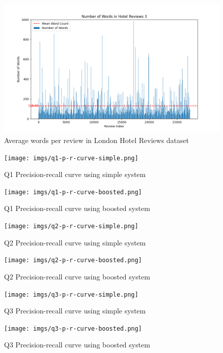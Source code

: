 \documentclass[sigconf]{acmart}
\begin{document}
\begin{figure}[H]
  \centering
  \includegraphics[width=\linewidth]{imgs/word_count_3.png}
  \caption{Average words per review in London Hotel Reviews dataset}
  \label{fig:reviewWords3}
\end{figure}


\begin{figure}[H]
  \centering
  \texttt{[image: imgs/q1-p-r-curve-simple.png]}
  \caption{Q1 Precision-recall curve using simple system}
  \label{fig:q1_simple}
\end{figure}

\begin{figure}[H]
  \centering
  \texttt{[image: imgs/q1-p-r-curve-boosted.png]}
  \caption{Q1 Precision-recall curve using boosted system}
  \label{fig:q1_boosted}
\end{figure}


\begin{figure}[H]
  \centering
  \texttt{[image: imgs/q2-p-r-curve-simple.png]}
  \caption{Q2 Precision-recall curve using simple system}
  \label{fig:q2_simple}
\end{figure}

\begin{figure}[H]
  \centering
  \texttt{[image: imgs/q2-p-r-curve-boosted.png]}
  \caption{Q2 Precision-recall curve using boosted system}
  \label{fig:q2_boosted}
\end{figure}

\begin{figure}[H]
  \centering
  \texttt{[image: imgs/q3-p-r-curve-simple.png]}
  \caption{Q3 Precision-recall curve using simple system}
  \label{fig:q3_simple}
\end{figure}

\begin{figure}[H]
  \centering
  \texttt{[image: imgs/q3-p-r-curve-boosted.png]}
  \caption{Q3 Precision-recall curve using boosted system}
  \label{fig:q3_boosted}
\end{figure}
\end{document}
